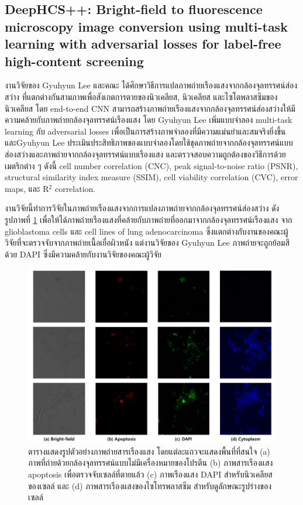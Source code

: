 \documentclass[12pt,oneside,openright,a4paper]{cpe-thai-project}
\begin{document}
\subsection{DeepHCS++: Bright-field to fluorescence microscopy image conversion using multi-task learning with adversarial losses for label-free high-content screening}
 งานวิจัยของ Gyuhyun Lee และคณะ \cite{28} ได้ศึกษาวิธีการแปลภาพถ่ายเรืองแสงจากกล้องจุลทรรศน์ส่องสว่าง ที่แตกต่างกันสามภาพเพื่อสังเกตการตายของนิวเคลียส, นิวเคลียส และไซโตพลาสซึมของนิวเคลียส โดย end-to-end CNN สามารถสร้างภาพถ่ายเรืองแสงจากกล้องจุลทรรศน์ส่องสว่างให้มีความคล้ายกับภาพถ่ายกล้องจุลทรรศน์เรืองแสง โดย Gyuhyun Lee เพิ่มแบบจำลอง multi-task learning กับ adversarial losses เพื่อเป็นการสร้างภาพจำลองที่มีความแม่นยำและสมจริงยิ่งขึ้น และGyuhyun Lee ประเมินประสิทธิภาพของแบบจำลองโดยใช้ชุดภาพถ่ายจากกล้องจุลทรรศน์แบบส่องสว่างและภาพถ่ายจากกล้องจุลทรรศน์แบบเรืองแสง และตรวจสอบความถูกต้องของวิธีการด้วยเมตริกต่าง ๆ ดังนี้ cell number correlation (CNC), peak signal-to-noise ratio (PSNR), structural similarity index measure (SSIM), cell viability correlation (CVC), error maps, และ R$^2$ correlation.

 งานวิจัยนี้ทำการวิจัยในภาพถ่ายเรืองแสงจากการแปลงภาพถ่ายจากกล้องจุลทรรศน์ส่องสว่าง  ดังรูปภาพที่ \ref{fig:DeepHCS} เพื่อให้ได้ภาพถ่ายเรืองแสงที่คล้ายกับภาพถ่ายที่ออกมาจากกล้องจุลทรรศน์เรืองแสง จาก glioblastoma cells และ cell lines of lung adenocarcinoma ซึ่งแตกต่างกับงานของคณะผู้วิจัยที่จะตรวจจับจากภาพถ่ายเนื้อเยื่อผิวหนัง แต่งานวิจัยของ Gyuhyun Lee ภาพถ่ายจะถูกย้อมสีด้วย DAPI ซึ่งมีความคล้ายกับงานวิจัยของคณะผู้วิจัย
 \begin{figure}[!h]
    \centering
    \includegraphics[scale=0.35]{images/paper-deepHDS+.png}
    \caption[รูปตัวอย่างจากเปเปอร์ DeepHCS]{ตารางแสดงรูปตัวอย่างภาพถ่ายสารเรืองแสง โดยแต่ละแถวจะแสดงพื้นที่ที่สนใจ (a) ภาพที่ถ่ายด้วยกล้องจุลทรรศน์แบบไม่มีเครื่องหมายของโปรตีน (b) ภาพสารเรืองแสง apoptosis เพื่อตรวจจับเซลล์ที่ตายแล้ว (c) ภาพเรืองแสง DAPI สำหรับนิวเคลียสของเซลล์ และ (d) ภาพสารเรืองแสงของไซโทรพลาสซึม สำหรับดูลักษณะรูปร่างของเซลล์}
    \label{fig:DeepHCS}
\end{figure}
\end{document}
